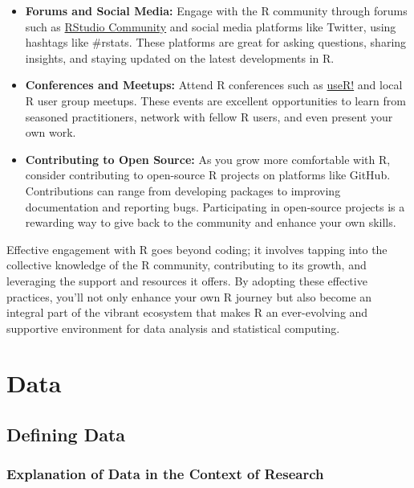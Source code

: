 \documentclass[
]{book}
\begin{document}
\begin{itemize}
\item
  \textbf{Forums and Social Media:} Engage with the R community through forums such as \href{https://community.rstudio.com/}{RStudio Community} and social media platforms like Twitter, using hashtags like \#rstats. These platforms are great for asking questions, sharing insights, and staying updated on the latest developments in R.
\item
  \textbf{Conferences and Meetups:} Attend R conferences such as \href{https://user2020.r-project.org/}{useR!} and local R user group meetups. These events are excellent opportunities to learn from seasoned practitioners, network with fellow R users, and even present your own work.
\item
  \textbf{Contributing to Open Source:} As you grow more comfortable with R, consider contributing to open-source R projects on platforms like GitHub. Contributions can range from developing packages to improving documentation and reporting bugs. Participating in open-source projects is a rewarding way to give back to the community and enhance your own skills.
\end{itemize}

Effective engagement with R goes beyond coding; it involves tapping into the collective knowledge of the R community, contributing to its growth, and leveraging the support and resources it offers. By adopting these effective practices, you'll not only enhance your own R journey but also become an integral part of the vibrant ecosystem that makes R an ever-evolving and supportive environment for data analysis and statistical computing.

\hypertarget{data}{%
\chapter{Data}\label{data}}

\hypertarget{defining-data}{%
\section{Defining Data}\label{defining-data}}

\hypertarget{explanation-of-data-in-the-context-of-research}{%
\subsection*{Explanation of Data in the Context of Research}\label{explanation-of-data-in-the-context-of-research}}
\end{document}
